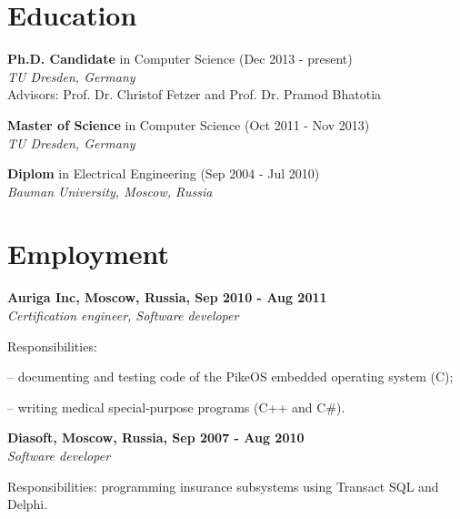 \documentclass[letterpaper]{article}
\renewenvironment{itemize}{
  \begin{list}{}{
    \setlength{\leftmargin}{1.5em}
  }
}{
  \end{list}
}
\begin{document}
\section*{Education}

\begin{itemize}

 \item \textbf{Ph.D. Candidate} in Computer Science (Dec 2013 - present)\\
 {\em  TU Dresden, Germany}\\
Advisors: Prof. Dr. Christof Fetzer and Prof. Dr. Pramod Bhatotia

 \item \textbf{Master of Science} in Computer Science (Oct 2011 - Nov 2013) \\
 {\em  TU Dresden, Germany}

\item \textbf{Diplom} in Electrical Engineering (Sep 2004 - Jul 2010)\\
  {\em Bauman University, Moscow, Russia} 

\end{itemize}



\section*{Employment}

{\bf Auriga Inc, Moscow, Russia, Sep 2010 - Aug 2011}\\
{\em Certification engineer, Software developer}
\begin{itemize}
	\item Responsibilities:
		\begin{itemize}
		\item -- documenting and testing code of the PikeOS embedded operating system (C);
		\item -- writing medical special-purpose programs (C++ and C\#).
		\end{itemize}
	\item 
\end{itemize}

{\bf Diasoft, Moscow, Russia, Sep 2007 - Aug 2010}\\
{\em Software developer}
\begin{itemize}
	\item Responsibilities: programming insurance subsystems using Transact SQL and Delphi.
\end{itemize}
\end{document}
